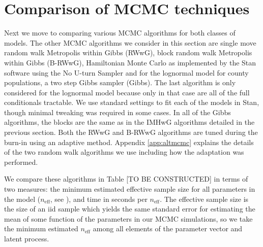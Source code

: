 \documentclass[12pt]{article}
\begin{document}


\section{Comparison of MCMC techniques}\label{sec:compest}

Next we move to comparing various MCMC algorithms for both classes of models. The other MCMC algorithms we consider in this section are single move random walk Metropolis within Gibbs (RWwG), block random walk Metropolis within Gibbs (B-RWwG), Hamiltonian Monte Carlo as implemented by the Stan software \citep{carpenter2015stan} using the No U-turn Sampler \citep{homan2014no} and for the lognormal model for county populations, a two step Gibbs sampler (Gibbs). The last algorithm is only considered for the lognormal model because only in that case are all of the full conditionals tractable. We use standard settings to fit each of the models in Stan, though minimal tweaking was required in some cases. In all of the Gibbs algorithms, the blocks are the same as in the IMHwG algorithms detailed in the previous section. Both the RWwG and B-RWwG algorithms are tuned during the burn-in using an adaptive method. Appendix \ref{app:altmcmc} explains the details of the two random walk algorithms we use including how the adaptation was performed. 

We compare these algorithms in Table [TO BE CONSTRUCTED] %
 in terms of two measures: the minimum estimated effective sample size for all parameters in the model ($n_{\text{eff}}$, see \citet[Section~12.3.5]{robert2013monte}), and time in seconds per $n_{\text{eff}}$. The effective sample size is the size of an iid sample which yields the same standard error for estimating the mean of some function of the parameters in our MCMC simulations, so we take the minimum estimated $n_{\text{eff}}$ among all elements of the parameter vector and latent process. 
\end{document}
